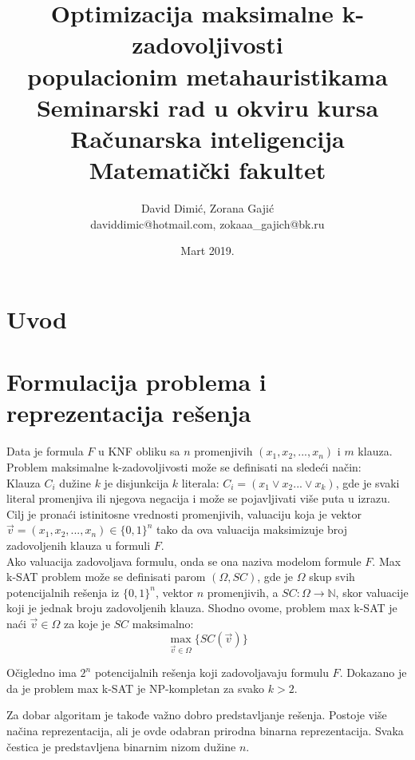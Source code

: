 \documentclass{article}
\title{Optimizacija maksimalne k-zadovoljivosti\\ populacionim metahauristikama\\ \small{Seminarski rad u okviru kursa\\ Računarska inteligencija\\ Matematički fakultet}}
\author{David Dimić, Zorana Gajić \\ daviddimic@hotmail.com, zokaaa\_gajich@bk.ru}
\date{Mart 2019.}
\begin{document}
\maketitle  
\tableofcontents
\newpage

\abstract{
}

\section{Uvod}

\section{Formulacija problema  i reprezentacija rešenja}
Data je formula $F$ u KNF obliku sa $n$ promenjivih $(x_1, x_2, ..., x_n)$ i $m$ klauza. Problem maksimalne k-zadovoljivosti može se definisati na sledeći način:\\ 

Klauza $C_i$ dužine $k$ je disjunkcija $k$ literala: 
$C_i = (x_1  \vee x_2 ... \vee x_k)$, gde je svaki literal promenjiva ili njegova negacija i može se pojavljivati više puta u izrazu.
Cilj je pronaći istinitosne vrednosti promenjivih, valuaciju koja je vektor $\vec{v} = (x_1, x_2, ..., x_n) \in \{ 0,1 \}^n$ tako da ova valuacija maksimizuje broj zadovoljenih klauza u formuli $F$.\\

Ako valuacija zadovoljava formulu, onda se ona naziva modelom formule $F$. Max k-SAT problem može se definisati parom $(\Omega, SC)$, gde je $\Omega$ skup svih potencijalnih rešenja iz $\{0,1\}^n$, vektor $n$ promenjivih, a $SC:\Omega \rightarrow \mathbb{N}$, skor valuacije koji je jednak broju zadovoljenih klauza. Shodno ovome, problem max k-SAT je naći $\vec{v} \in \Omega$ za koje je $SC$ maksimalno:\\
$$\max_{\vec{v} \in \Omega}\{SC(\vec{v})\}$$

Očigledno ima $2^n$ potencijalnih rešenja koji zadovoljavaju formulu $F$. Dokazano je da je problem max k-SAT je NP-kompletan za svako $k>2$. %

Za dobar algoritam je takođe važno dobro predstavljanje rešenja. Postoje više načina reprezentacija, ali je ovde odabran prirodna binarna reprezentacija. Svaka čestica je predstavljena binarnim nizom dužine $n$.


\end{document}
